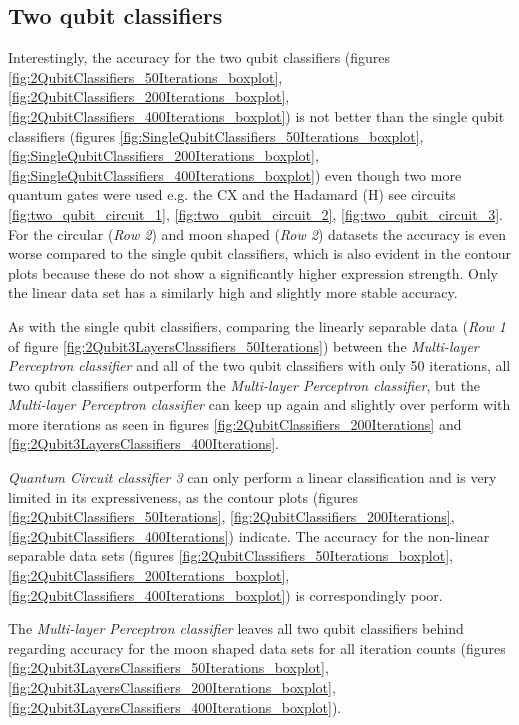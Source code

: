 \subsection{Two qubit classifiers}
\label{subsection:two_qubit_circuits_discussion}
Interestingly, the accuracy for the two qubit classifiers (figures \ref{fig:2QubitClassifiers_50Iterations_boxplot}, \ref{fig:2QubitClassifiers_200Iterations_boxplot}, \ref{fig:2QubitClassifiers_400Iterations_boxplot}) is not better than the single qubit classifiers (figures \ref{fig:SingleQubitClassifiers_50Iterations_boxplot}, \ref{fig:SingleQubitClassifiers_200Iterations_boxplot}, \ref{fig:SingleQubitClassifiers_400Iterations_boxplot}) even though two more quantum gates were used e.g. the $\mathrm{CX}$ and the Hadamard ($\mathrm{H}$) see circuits \ref{fig:two_qubit_circuit_1}, \ref{fig:two_qubit_circuit_2}, \ref{fig:two_qubit_circuit_3}. For the circular (\textit{Row 2}) and moon shaped (\textit{Row 2}) datasets the accuracy is even worse compared to the single qubit classifiers, which is also evident in the contour plots because these do not show a significantly higher expression strength. Only the linear data set has a similarly high and slightly more stable accuracy. 

As with the single qubit classifiers, comparing the linearly separable data (\textit{Row 1} of figure \ref{fig:2Qubit3LayersClassifiers_50Iterations}) between the \textit{Multi-layer Perceptron classifier} and all of the two qubit classifiers with only 50 iterations, all two qubit classifiers outperform the \textit{Multi-layer Perceptron classifier}, but the \textit{Multi-layer Perceptron classifier} can keep up again and slightly over perform with more iterations as seen in figures \ref{fig:2QubitClassifiers_200Iterations} and \ref{fig:2Qubit3LayersClassifiers_400Iterations}.

\textit{Quantum Circuit classifier 3} can only perform a linear classification and is very limited in its expressiveness, as the contour plots (figures \ref{fig:2QubitClassifiers_50Iterations}, \ref{fig:2QubitClassifiers_200Iterations}, \ref{fig:2QubitClassifiers_400Iterations}) indicate. The accuracy for the non-linear separable data sets (figures \ref{fig:2QubitClassifiers_50Iterations_boxplot}, \ref{fig:2QubitClassifiers_200Iterations_boxplot}, \ref{fig:2QubitClassifiers_400Iterations_boxplot}) is correspondingly poor.

The \textit{Multi-layer Perceptron classifier} leaves all two qubit classifiers behind regarding accuracy for the moon shaped data sets for all iteration counts (figures \ref{fig:2Qubit3LayersClassifiers_50Iterations_boxplot}, \ref{fig:2Qubit3LayersClassifiers_200Iterations_boxplot}, \ref{fig:2Qubit3LayersClassifiers_400Iterations_boxplot}). 

